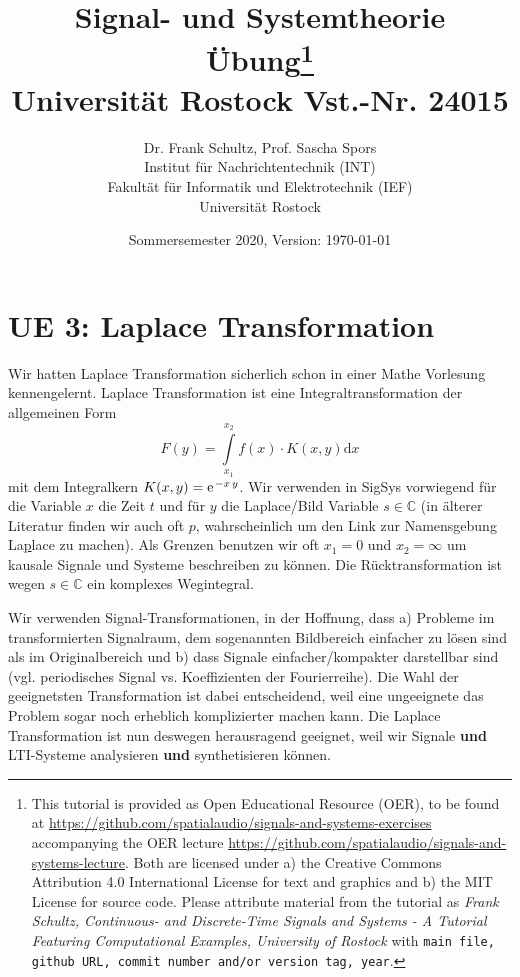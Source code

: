 \documentclass[11pt,a4paper,DIV=12]{scrartcl}
\title{Signal- und Systemtheorie\\
Übung\thanks{
This tutorial is provided as Open Educational Resource (OER), to be found at
\url{https://github.com/spatialaudio/signals-and-systems-exercises}
accompanying the OER lecture
\url{https://github.com/spatialaudio/signals-and-systems-lecture}.
%
Both are licensed under a) the Creative Commons Attribution 4.0 International
License for text and graphics and b) the MIT License for source code.
%
Please attribute material from the tutorial as \textit{Frank Schultz,
Continuous- and Discrete-Time Signals and Systems - A Tutorial Featuring
Computational Examples, University of Rostock} with
\texttt{main file, github URL, commit number and/or version tag, year}.
}
\\
\small Universität Rostock Vst.-Nr. 24015}
\author{Dr. Frank Schultz, Prof. Sascha Spors\\
\small Institut für Nachrichtentechnik (INT)\\
\small Fakultät für Informatik und Elektrotechnik (IEF)\\
\small Universität Rostock
}
\date{Sommersemester 2020, Version: \today}
\numberwithin{equation}{section}
\numberwithin{figure}{section}
\newcommand\fsd{\mathrm{d}} %
\begin{document}
\maketitle
\tableofcontents

%




\setcounter{section}{2}

\newpage
\section{UE 3: Laplace Transformation}
%
Wir hatten Laplace Transformation sicherlich schon in einer Mathe Vorlesung
kennengelernt.
Laplace Transformation ist eine Integraltransformation der allgemeinen Form
\begin{equation}
F(y) = \int\limits_{x_1}^{x_2} f(x) \cdot K(x,y) \fsd x
\end{equation}
mit dem Integralkern $K(x,y) = \e^{-x\,y}$.
Wir verwenden in SigSys vorwiegend für die Variable $x$ die Zeit $t$ und für
$y$ die Laplace/Bild Variable $s\in\mathbb{C}$ (in älterer Literatur finden
wir auch oft $p$, wahrscheinlich um den Link zur Namensgebung La\underline{p}lace
zu machen).
Als Grenzen benutzen wir oft $x_1=0$ und $x_2=\infty$ um kausale Signale und
Systeme beschreiben zu können.
%
Die Rücktransformation ist wegen $s\in\mathbb{C}$ ein komplexes Wegintegral.

Wir verwenden Signal-Transformationen, in der Hoffnung, dass a) Probleme im
transformierten Signalraum, dem sogenannten Bildbereich einfacher zu lösen
sind als im Originalbereich und b) dass Signale einfacher/kompakter darstellbar
sind (vgl. periodisches Signal vs. Koeffizienten der Fourierreihe).
%
Die Wahl der geeignetsten Transformation ist dabei entscheidend, weil eine
ungeeignete das Problem sogar noch erheblich komplizierter machen kann.
%
Die Laplace Transformation ist nun deswegen herausragend geeignet, weil
wir Signale \textbf{und} LTI-Systeme analysieren \textbf{und} synthetisieren
können.
\end{document}
